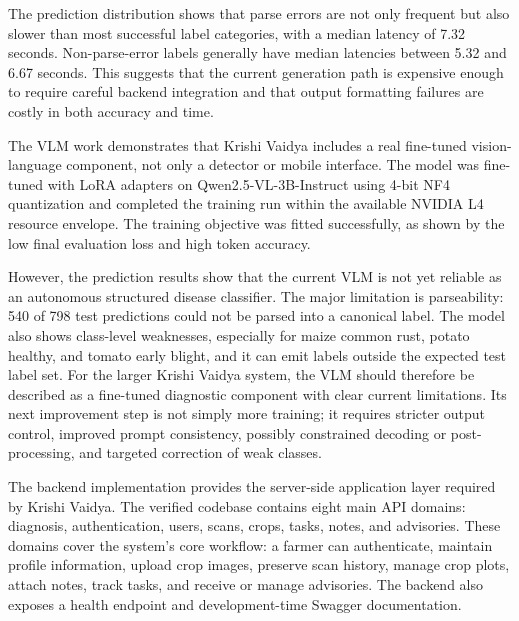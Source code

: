 The prediction distribution shows that parse errors are not only frequent but also slower than
most successful label categories, with a median latency of 7.32 seconds. Non-parse-error labels
generally have median latencies between 5.32 and 6.67 seconds. This suggests that the current
generation path is expensive enough to require careful backend integration and that output
formatting failures are costly in both accuracy and time.


The VLM work demonstrates that Krishi Vaidya includes a real fine-tuned vision-language component,
not only a detector or mobile interface. The model was fine-tuned with LoRA adapters on
Qwen2.5-VL-3B-Instruct using 4-bit NF4 quantization and completed the training run within the
available NVIDIA L4 resource envelope. The training objective was fitted successfully, as shown by
the low final evaluation loss and high token accuracy.

However, the prediction results show that the current VLM is not yet reliable as an autonomous
structured disease classifier. The major limitation is parseability: 540 of 798 test predictions
could not be parsed into a canonical label. The model also shows class-level weaknesses, especially
for maize common rust, potato healthy, and tomato early blight, and it can emit labels outside the
expected test label set. For the larger Krishi Vaidya system, the VLM should therefore be described
as a fine-tuned diagnostic component with clear current limitations. Its next improvement step is
not simply more training; it requires stricter output control, improved prompt consistency,
possibly constrained decoding or post-processing, and targeted correction of weak classes.



The backend implementation provides the server-side application layer required by Krishi Vaidya.
The verified codebase contains eight main API domains: diagnosis, authentication, users, scans,
crops, tasks, notes, and advisories. These domains cover the system's core workflow: a farmer can
authenticate, maintain profile information, upload crop images, preserve scan history, manage crop
plots, attach notes, track tasks, and receive or manage advisories. The backend also exposes a
health endpoint and development-time Swagger documentation.

